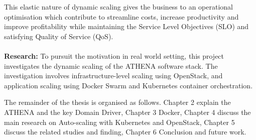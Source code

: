 This elastic nature of dynamic scaling gives the business to an operational optimisation which  contribute to streamline costs, increase productivity and improve profitability while maintaining the Service Level Objectives (SLO) and satisfying Quality of Service (QoS).
\\
\\
\textbf{Research:} \quad To pursuit the motivation in real world setting, this project investigates the dynamic scaling of the ATHENA software stack. The investigation involves infrastructure-level scaling using OpenStack, and application scaling using Docker Swarm and Kubernetes container orchestration.


The remainder of the thesis is organised as follows. Chapter 2 explain the ATHENA and the key Domain Driver, Chapter 3 Docker, Chapter 4 discuss the main research on Auto-scaling with Kubernetes and OpenStack, Chapter 5 discuss the related studies and finding,  Chapter 6 Conclusion and future work.

